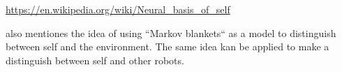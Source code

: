\documentclass[a4paper]{article}
\title{}
\date{}
\begin{document}
    \maketitle
    \url{https://en.wikipedia.org/wiki/Neural_basis_of_self}
    
    also \cite{friston-2013-life-as-we-know-it} mentiones the idea of using ``Markov blankets`` as a model to distinguish between self and the environment. The same idea kan be applied to make a distinguish between self and other robots.
     
     
\end{document}
